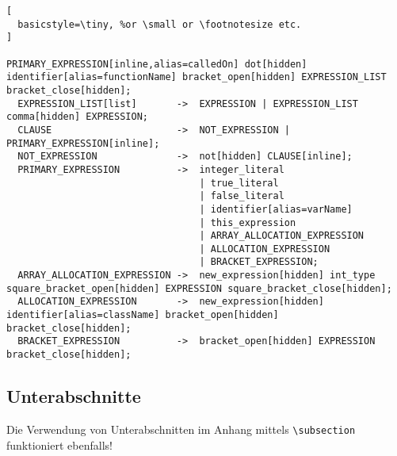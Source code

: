 \begin{lstlisting}[
  basicstyle=\tiny, %or \small or \footnotesize etc.
]
                                  PRIMARY_EXPRESSION[inline,alias=calledOn] dot[hidden] identifier[alias=functionName] bracket_open[hidden] EXPRESSION_LIST bracket_close[hidden];
  EXPRESSION_LIST[list]       ->  EXPRESSION | EXPRESSION_LIST comma[hidden] EXPRESSION;
  CLAUSE                      ->  NOT_EXPRESSION | PRIMARY_EXPRESSION[inline];
  NOT_EXPRESSION              ->  not[hidden] CLAUSE[inline];
  PRIMARY_EXPRESSION          ->  integer_literal
                                  | true_literal
                                  | false_literal
                                  | identifier[alias=varName]
                                  | this_expression
                                  | ARRAY_ALLOCATION_EXPRESSION
                                  | ALLOCATION_EXPRESSION
                                  | BRACKET_EXPRESSION;
  ARRAY_ALLOCATION_EXPRESSION ->  new_expression[hidden] int_type square_bracket_open[hidden] EXPRESSION square_bracket_close[hidden];
  ALLOCATION_EXPRESSION       ->  new_expression[hidden] identifier[alias=className] bracket_open[hidden] bracket_close[hidden];
  BRACKET_EXPRESSION          ->  bracket_open[hidden] EXPRESSION bracket_close[hidden];
\end{lstlisting}

  \subsection{Unterabschnitte}
  Die Verwendung von Unterabschnitten im Anhang
  mittels \texttt{\textbackslash subsection}
  funktioniert ebenfalls!

